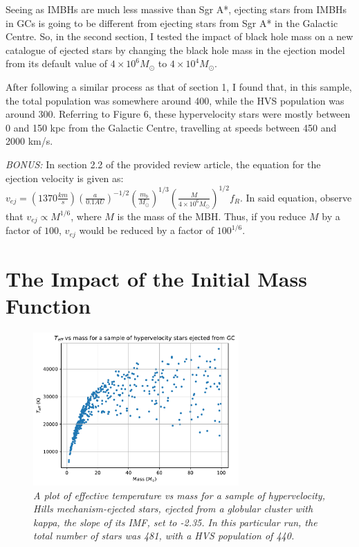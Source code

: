 \documentclass{article}
\begin{document}
Seeing as IMBHs are much less massive than Sgr A*, ejecting stars from IMBHs in GCs is going to be different from ejecting stars from Sgr A* in the Galactic Centre. So, in the second section, I tested the impact of black hole mass on a new catalogue of ejected stars by changing the black hole mass in the ejection model from its default value of $4 \times 10^6 M_{\odot}$ to $4 \times 10^4 M_{\odot}$. 

After following a similar process as that of section 1, I found that, in this sample, the total population was somewhere around 400, while the HVS population was around 300. Referring to Figure 6, these hypervelocity stars were mostly between 0 and 150 kpc from the Galactic Centre, travelling at speeds between 450 and 2000 km/s.

\textit{BONUS:}
In section 2.2 of the provided review article, the equation for the ejection velocity is given as: $v_{ej} = (1370 \frac{km}{s})(\frac{a}{0.1 AU})^{-1/2}(\frac{m_b}{M_{\odot}})^{1/3}(\frac{M}{4 \times 10^6 M_{\odot}})^{1/2}f_R$. In said equation, observe that $v_{ej} \propto M^{1/6}$, where $M$ is the mass of the MBH. Thus, if you reduce $M$ by a factor of $100$, $v_{ej}$ would be reduced by a factor of $100^{1/6}$.

\section{The Impact of the Initial Mass Function}

\begin{figure}[h!]
\caption{\textit{A plot of effective temperature vs mass
for a sample of hypervelocity, Hills mechanism-ejected stars, ejected from a globular cluster with kappa, the slope of its IMF, set to -2.35. In this particular run, the total number of stars was 481, with a HVS population of 440.}}
\centering
\includegraphics[width=0.7\textwidth]{Teff_vs_mass_hyp_3.pdf}
\end{figure}
\end{document}
